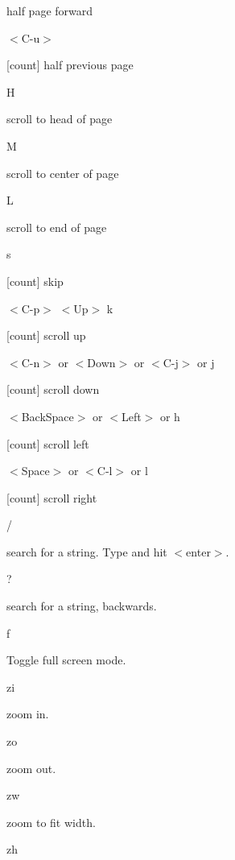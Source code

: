 \documentclass[a4paper,12pt]{article}
\newcommand{\apvlv}{\textsf{Apvlv{ }}}
\begin{document}
\begin{description}
[count] half page forward

\item $<$C-u$>$

[count] half previous page 

\item H

scroll to head of page

\item M

scroll to center of page

\item L

scroll to end of page

\item s

[count] skip

\item $<$C-p$>$
$<$Up$>$
k

[count] scroll up

\item  $<$C-n$>$ or 
 $<$Down$>$ or 
 $<$C-j$>$ or 
 j

[count] scroll down

\item $<$BackSpace$>$ or 
$<$Left$>$ or 
h

[count] scroll left

\item $<$Space$>$ or 
$<$C-l$>$ or 
l

[count] scroll right

\item /

search for a string. Type and hit $<$enter$>$.

\item ?

search for a string, backwards.

\item f

Toggle full screen mode. %

\item zi

zoom in.

\item zo

zoom out.

\item zw

zoom to fit width.

\item zh


\end{description}
\end{document}
